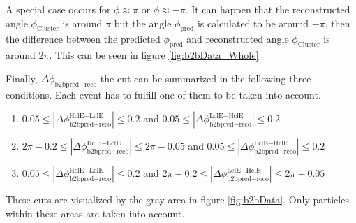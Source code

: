 \documentclass[a4paper,11pt,twosided,final,german,openbib,pdftex,listof=totoc,bibliography=totoc]{scrbook}
\begin{document}
A special case occurs for $\phi \approx \pi$ or $\phi \approx -\pi$. It can happen that the reconstructed angle $\phi_{\textrm{Cluster}}$ is around $\pi$ but the angle $\phi_{\textrm{pred}}$ is calculated to be around $-\pi$, then the difference between the predicted $\phi_{\textrm{pred}}$ and reconstructed angle $\phi_{\textrm{Cluster}}$ is around $2\pi$. This can be seen in figure \ref{fig:b2bData_Whole}

Finally, $\Delta \phi _{\textrm{b2bpred} - \textrm{reco}}$ the cut can be summarized in the following three conditions. Each event has to fulfill one of them to be taken into account.

\begin{enumerate}[label=(\alph*)]
	\item $0.05 \leq |\Delta \phi _{\textrm{b2bpred} - \textrm{reco}}^{\textrm{HclE}-\textrm{LclE}}| \leq 0.2$ and $ 0.05 \leq |\Delta \phi _{\textrm{b2bpred} - \textrm{reco}}^{\textrm{LclE}-\textrm{HclE}}| \leq 0.2$
	\item $2\pi - 0.2 \leq |\Delta \phi _{\textrm{b2bpred} - \textrm{reco}}^{\textrm{HclE}-\textrm{LclE}}|\leq 2\pi - 0.05$ and $ 0.05 \leq |\Delta \phi _{\textrm{b2bpred} - \textrm{reco}}^{\textrm{LclE}-\textrm{HclE}}| \leq 0.2$
	\item $0.05 \leq|\Delta \phi _{\textrm{b2bpred} - \textrm{reco}}^{\textrm{HclE}-\textrm{LclE}}| \leq 0.2 $ and $2\pi - 0.2 \leq |\Delta \phi _{\textrm{b2bpred} - \textrm{reco}}^{\textrm{LclE}-\textrm{HclE}}| \leq 2\pi - 0.05$
\end{enumerate}

These cuts are visualized by the gray area in figure \ref{fig:b2bData}. Only particles within these areas are taken into account.
\end{document}
